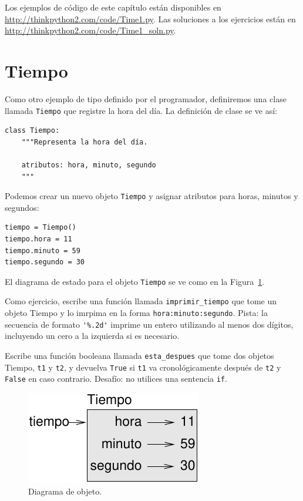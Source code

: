 \documentclass[10pt]{book}
\begin{document}
Los ejemplos de código de este capítulo están disponibles en
\url{http://thinkpython2.com/code/Time1.py}.
Las soluciones a los ejercicios están en
\url{http://thinkpython2.com/code/Time1_soln.py}.


\section{Tiempo}
\label{isafter}

Como otro ejemplo de tipo definido por el programador, definiremos una clase
llamada {\tt Tiempo} que registre la hora del día.  La definición de clase
se ve así: 
  

\begin{verbatim}
class Tiempo:
    """Representa la hora del día.

    atributos: hora, minuto, segundo
    """
\end{verbatim}
%
Podemos crear un nuevo objeto {\tt Tiempo} y asignar
atributos para horas, minutos y segundos:

\begin{verbatim}
tiempo = Tiempo()
tiempo.hora = 11
tiempo.minuto = 59
tiempo.segundo = 30
\end{verbatim}
%
El diagrama de estado para el objeto {\tt Tiempo} se ve como en la Figura~\ref{fig.time}.

Como ejercicio, escribe una función llamada \verb"imprimir_tiempo" que tome un
objeto Tiempo y lo imrpima en la forma {\tt hora:minuto:segundo}.
Pista: la secuencia de formato \verb"'%.2d'" imprime un entero utilizando
al menos dos dígitos, incluyendo un cero a la izquierda si es necesario.

Escribe una función booleana llamada \verb"esta_despues" que
tome dos objetos Tiempo, {\tt t1} y {\tt t2}, y
devuelva {\tt True} si {\tt t1} va cronológicamente después de {\tt t2} y
{\tt False} en caso contrario.  Desafío: no utilices una sentencia {\tt if}.

\begin{figure}
\centerline
{\includegraphics[scale=0.8]{figs/time.pdf}}
\caption{Diagrama de objeto.}
\label{fig.time}
\end{figure}
\end{document}
